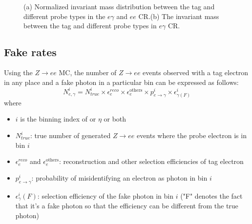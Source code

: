 \begin{figure}[!htbp]
\centering
{}
\caption [] {(a) Normalized invariant mass distribution between the tag and different probe types in the $e\gamma$ and $ee$ CR.(b) The invariant mass between the tag and different probe types in $e\gamma$ CR.}
\label{fig:egammafake_tagmass}
\end{figure} 
  

\FloatBarrier
\subsection{Fake rates}
\label{sec:egammafakes_fr}

Using the $Z\to ee$ MC, the number of $Z\to ee$ events observed with a tag electron in any place and a fake photon in a particular bin can be expressed as follows:
\begin{equation}
N_{e,\gamma}^i = N_{true}^i \times \epsilon_e^{reco} \times \epsilon_e^{\mathrm{others}} \times p_{e\to\gamma}^i \times \epsilon_{\gamma(F)}^i
\end{equation}
where
\begin{itemize}
\item $i$ is the binning index of \pT or $\eta$ or both
\item $N_{true}^i$: true number of generated $Z\to ee$ events where the probe electron is in bin $i$
\item $\epsilon_e^{reco}$ and $\epsilon_e^{\mathrm{others}}$: reconstruction and other selection efficiencies of tag electron
\item $p_{e\to\gamma}^i$: probability of misidentifying an electron as photon in bin $i$
\item $\epsilon_{\gamma}^i(F)$: selection efficiency of the fake photon in bin $i$ ("F" denotes the fact that it's a fake photon so that the efficiency can be different from the true photon)
\end{itemize}

